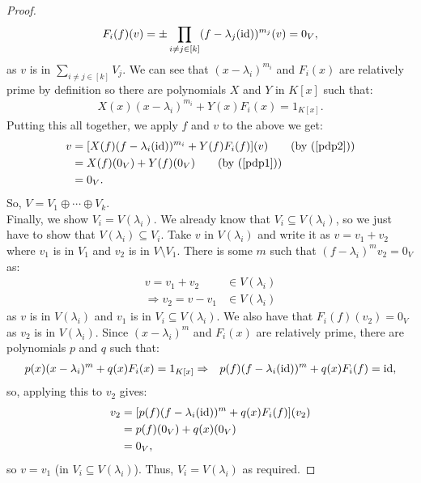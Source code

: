 \begin{proof}
\begin{gather}
        F_i(f)(v) = \pm \prod_{i \neq j \in [k]}(f - \lambda_j(\operatorname{id}))^{m_j}(v) = 0_V,
    \end{gather} as $v$ is in $\sum_{i \neq j \in [k]} V_j$. We can see that
    $(x - \lambda_i)^{m_i}$ and $F_i(x)$ are relatively prime by definition
    so there are polynomials $X$ and $Y$ in $K[x]$ such that: \begin{gather} \label{pdp2}
        X(x)(x - \lambda_i)^{m_i} + Y(x)F_i(x) = 1_{K[x]}.
    \end{gather} Putting this all together, we apply $f$ and $v$ to the above
    we get: \begin{align*}
        v &= [X(f)(f - \lambda_i(\ID))^{m_i} + Y(f)F_i(f)](v) \tag{by (\ref{pdp2})}\\
          &= X(f)(0_V) + Y(f)(0_V) \tag{by (\ref{pdp1})}\\
          &= 0_V.
    \end{align*} So, $V = V_1 \oplus \cdots \oplus V_k$.
    \\[\baselineskip]
    Finally, we show $V_i = V(\lambda_i)$. We already know that 
    $V_i \subseteq V(\lambda_i)$, so we just have to show that 
    $V(\lambda_i) \subseteq V_i$. Take $v$ in $V(\lambda_i)$ and
    write it as $v = v_1 + v_2$ where $v_1$ is in $V_1$ and $v_2$ is in
    $V \setminus V_1$. There is some $m$ such that $(f - \lambda_i)^mv_2 = 0_V$
    as: \begin{align*}
        v = v_1 + v_2 &\in V(\lambda_i) \\
        \Rightarrow v_2 = v - v_1 &\in V(\lambda_i)
    \end{align*} as $v$ is in $V(\lambda_i)$ and $v_1$ is in 
    $V_i \subseteq V(\lambda_i)$. We also have that $F_i(f)(v_2) = 0_V$ as
    $v_2$ is in $V(\lambda_i)$. Since $(x - \lambda_i)^m$ and $F_i(x)$
    are relatively prime, there are polynomials $p$ and $q$ such that: \begin{align*}
        &p(x)(x - \lambda_i)^m + q(x)F_i(x) = 1_{K[x]}
        \Rightarrow & p(f)(f - \lambda_i(\operatorname{id}))^m + q(x)F_i(f) = \operatorname{id},
    \end{align*} so, applying this to $v_2$ gives: \begin{align*}
        v_2 &= [p(f)(f - \lambda_i(\operatorname{id}))^m + q(x)F_i(f)](v_2) \\
        &= p(f)(0_V) + q(x)(0_V) \\
        &= 0_V,
    \end{align*} so $v = v_1$ (in $V_i \subseteq V(\lambda_i)$). Thus, 
    $V_i = V(\lambda_i)$ as required.
\end{proof}

